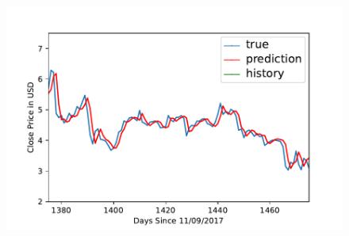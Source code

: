 \begin{figure}[p]
\begin{minipage}{.4\textwidth}
\end{minipage}
\ \
\begin{minipage}{.4\textwidth}
\includegraphics[width=1.0\textwidth]{images/EOS-USD-prediction-model-zoomed.pdf}
\end{minipage}


\end{figure}
